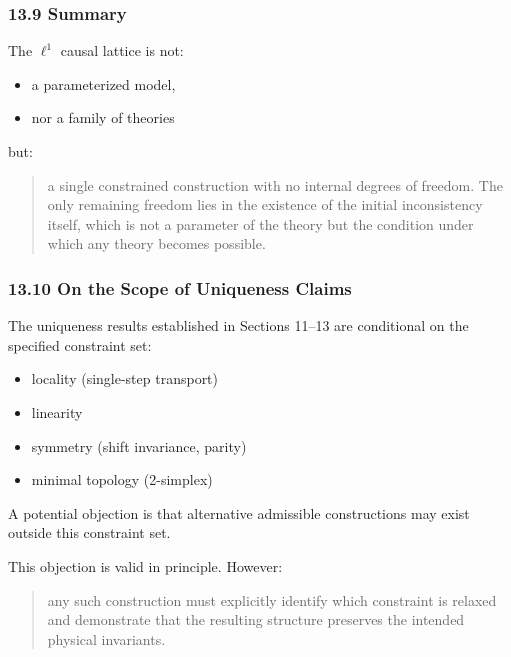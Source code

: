 \documentclass[
]{article}
\providecommand{\tightlist}{%
  \setlength{\itemsep}{0pt}\setlength{\parskip}{0pt}}
\begin{document}
\hypertarget{summary}{%
\subsubsection{13.9 Summary}\label{summary}}

The \(\ell^1\) causal lattice is not:

\begin{itemize}
\tightlist
\item
  a parameterized model,
\item
  nor a family of theories
\end{itemize}

but:

\begin{quote}
a single constrained construction with no internal degrees of freedom.
The only remaining freedom lies in the existence of the initial
inconsistency itself, which is not a parameter of the theory but the
condition under which any theory becomes possible.
\end{quote}

\hypertarget{on-the-scope-of-uniqueness-claims}{%
\subsubsection{13.10 On the Scope of Uniqueness
Claims}\label{on-the-scope-of-uniqueness-claims}}

The uniqueness results established in Sections 11--13 are conditional on
the specified constraint set:

\begin{itemize}
\tightlist
\item
  locality (single-step transport)
\item
  linearity
\item
  symmetry (shift invariance, parity)
\item
  minimal topology (2-simplex)
\end{itemize}

A potential objection is that alternative admissible constructions may
exist outside this constraint set.

This objection is valid in principle. However:

\begin{quote}
any such construction must explicitly identify which constraint is
relaxed and demonstrate that the resulting structure preserves the
intended physical invariants.
\end{quote}
\end{document}
